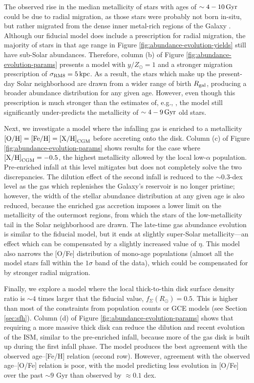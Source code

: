 \documentclass[twocolumn,twocolappendix,linenumbers]{aastex631}
\newcommand{\mathOH}{{\rm [O/H]}}
\newcommand{\mathFeH}{{\rm [Fe/H]}}
\newcommand{\kpc}{\,{\rm kpc}}
\begin{document}
The observed rise in the median metallicity of stars with ages of $\sim4-10\,{\rm Gyr}$ could be due to radial migration, as those stars were probably not born in-situ, but rather migrated from the dense inner metal-rich regions of the Galaxy \citep{feuillet_age-resolved_2018}. Although our fiducial model does include a prescription for radial migration, the majority of stars in that age range in Figure \ref{fig:abundance-evolution-yields} still have sub-Solar abundances. Therefore, column (b) of Figure \ref{fig:abundance-evolution-params} presents a model with $y/Z_\odot=1$ and a stronger migration prescription of $\sigma_{\rm RM8}=5\kpc$. As a result, the stars which make up the present-day Solar neighborhood are drawn from a wider range of birth $R_{\rm gal}$, producing a broader abundance distribution for any given age. However, even though this prescription is much stronger than the estimates of, e.g., \citet{frankel_measuring_2018}, the model still significantly under-predicts the metallicity of $\sim4-9\,{\rm Gyr}$ old stars.

Next, we investigate a model where the infalling gas is enriched to a metallicity $\mathOH=\mathFeH={\rm [X/H]}_{\rm CGM}$ before accreting onto the disk. Column (c) of Figure \ref{fig:abundance-evolution-params} shows results for the case where ${\rm [X/H]}_{\rm CGM}=-0.5$, the highest metallicity allowed by the local low-$\alpha$ population. Pre-enriched infall at this level mitigates but does not completely solve the two discrepancies. The dilution effect of the second infall is reduced to the $\sim0.3$-dex level as the gas which replenishes the Galaxy's reservoir is no longer pristine; however, the width of the stellar abundance distribution at any given age is also reduced, because the enriched gas accretion imposes a lower limit on the metallicity of the outermost regions, from which the stars of the low-metallicity tail in the Solar neighborhood are drawn. The late-time gas abundance evolution is similar to the fiducial model, but it ends at slightly super-Solar metallicity---an effect which can be compensated by a slightly increased value of $\eta$. This model also narrows the [O/Fe] distribution of mono-age populations (almost all the model stars fall within the $1\sigma$ band of the data), which could be compensated for by stronger radial migration.

Finally, we explore a model where the local thick-to-thin disk surface density ratio is $\sim4$ times larger that the fiducial value, $f_\Sigma(R_\odot)=0.5$. This is higher than most of the constraints from population counts or GCE models (see Section \ref{sec:sfh}). Column (d) of Figure \ref{fig:abundance-evolution-params} shows that requiring a more massive thick disk can reduce the dilution and recent evolution of the ISM, similar to the pre-enriched infall, because more of the gas disk is built up during the first infall phase. The model produces the best agreement with the observed age--[Fe/H] relation (second row). However, agreement with the observed age--[O/Fe] relation is poor, with the model predicting less evolution in [O/Fe] over the past $\sim9$ Gyr than observed by $\approx0.1$ dex.
\end{document}
